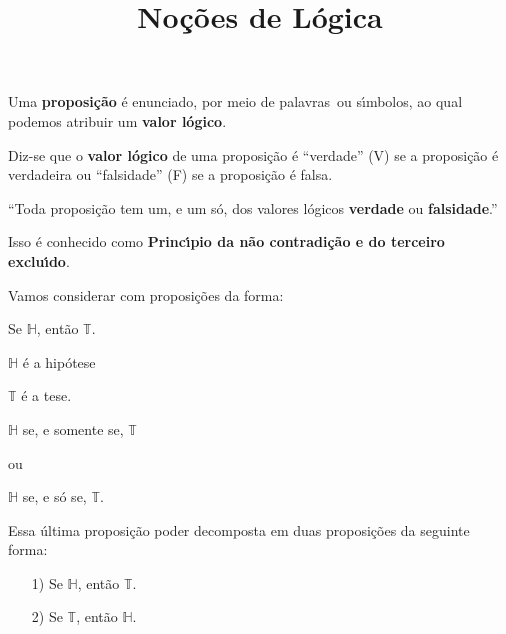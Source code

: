\documentclass{beamer}
\title{No\c{c}\~oes de L\'ogica}
\author[\autor]{\autor}
\institute[\instituto]{\instituto}
\date{}
\begin{document}
    \begin{frame}
        \maketitle
    \end{frame}


    \begin{frame}
        \begin{definicao}
            Uma \textbf{proposi\c{c}\~ao} \'e enunciado, \pause por meio de palavras\pause\ ou s{\'\i}mbolos, \pause ao qual podemos atribuir um \textbf{valor l\'ogico}.\pause
        \end{definicao}

        \begin{definicao}
            Diz-se que o \textbf{valor l\'ogico} \pause de uma proposi\c{c}\~ao \'e \pause ``verdade'' (V) \pause se a proposi\c{c}\~ao \'e verdadeira \pause ou ``falsidade'' (F) \pause se a proposi\c{c}\~ao \'e falsa.
        \end{definicao}
    \end{frame}

    \begin{frame}
        \begin{center}
            ``Toda proposi\c{c}\~ao tem um, \pause e um s\'o, \pause dos valores l\'ogicos \textbf{verdade} ou \textbf{falsidade}.''\pause
        \end{center}
        Isso \'e conhecido como \pause \textbf{Princ{\'\i}pio da n\~ao contradi\c{c}\~ao \pause e do terceiro exclu{\'\i}do}.\pause
    \end{frame}

    \begin{frame}
        Vamos considerar com proposi\c{c}\~oes da forma:\pause

        \begin{center}
            Se $\mathbb{H}$, ent\~ao $\mathbb{T}$.\pause
        \end{center}

        $\mathbb{H}$ \'e a hip\'otese\pause

        $\mathbb{T}$ \'e a tese.\pause

        \begin{center}
            $\mathbb{H}$ se, e somente se, $\mathbb{T}$\pause

            ou

            $\mathbb{H}$ se, e s\'o se, $\mathbb{T}$.\pause
        \end{center}

        Essa última proposi\c{c}\~ao poder decomposta em duas proposi\c{c}\~oes da seguinte forma:\pause
        \begin{itemize}
            \item[1)] Se $\mathbb{H}$, \pause ent\~ao $\mathbb{T}$.\pause
            \item[2)] Se $\mathbb{T}$, \pause ent\~ao $\mathbb{H}$.
        \end{itemize}
    \end{frame}
\end{document}
